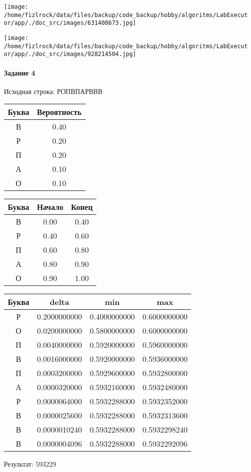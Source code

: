 \documentclass[a4paper, 12pt]{article}
\begin{document}
\texttt{[image: /home/fizlrock/data/files/backup/code\_backup/hobby/algoritms/LabExecutor/app/./doc\_src/images/631408673.jpg]}

\texttt{[image: /home/fizlrock/data/files/backup/code\_backup/hobby/algoritms/LabExecutor/app/./doc\_src/images/928214504.jpg]}
\paragraph{Задание 4}


Исходная строка: РОПВПАРВВВ

\begin{center}
 \begin{tabular}{ |c|c| } 
  \hline
     Буква & Вероятность \\ \hline
В & 0.40\\\hline
Р & 0.20\\\hline
П & 0.20\\\hline
А & 0.10\\\hline
О & 0.10
\\ \hline \end{tabular}
\end{center}
\begin{center}
 \begin{tabular}{ |c|c|c| } 
  \hline
     Буква & Начало & Конец \\ \hline
В & 0.00 & 0.40\\\hline
Р & 0.40 & 0.60\\\hline
П & 0.60 & 0.80\\\hline
А & 0.80 & 0.90\\\hline
О & 0.90 & 1.00
\\ \hline \end{tabular}
\end{center}
\begin{center}
 \begin{tabular}{ |c|c|c|c| } 
  \hline
     Буква & delta & min & max \\ \hline
Р & 0.2000000000 & 0.4000000000 & 0.6000000000\\\hline
О & 0.0200000000 & 0.5800000000 & 0.6000000000\\\hline
П & 0.0040000000 & 0.5920000000 & 0.5960000000\\\hline
В & 0.0016000000 & 0.5920000000 & 0.5936000000\\\hline
П & 0.0003200000 & 0.5929600000 & 0.5932800000\\\hline
А & 0.0000320000 & 0.5932160000 & 0.5932480000\\\hline
Р & 0.0000064000 & 0.5932288000 & 0.5932352000\\\hline
В & 0.0000025600 & 0.5932288000 & 0.5932313600\\\hline
В & 0.0000010240 & 0.5932288000 & 0.5932298240\\\hline
В & 0.0000004096 & 0.5932288000 & 0.5932292096
\\ \hline \end{tabular}
\end{center}
Результат: 593229
\pagebreak
\end{document}
